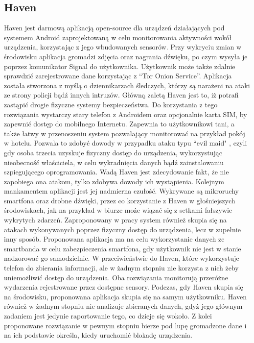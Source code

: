 \subsection{Haven}
Haven \cite{Haven} jest darmową aplikacją open-source dla urządzeń działających pod systemem Android zaprojektowaną w celu monitorowania aktywności wokół urządzenia,
korzystając z jego wbudowanych sensorów. Przy wykryciu zmian w środowisku aplikacja gromadzi zdjęcia oraz nagrania dźwięku, po czym wysyła je poprzez komunikator Signal do użytkownika. Użytkownik może także zdalnie sprawdzić zarejestrowane dane korzystając z ``Tor Onion Service''. Aplikacja została stworzona z myślą o dziennikarzach śledczych, którzy są narażeni na ataki ze strony policji bądź innych
intruzów.
\newline\newline
\indent Główną zaletą Haven jest to, iż potrafi zastąpić drogie fizyczne systemy bezpieczeństwa. Do korzystania z tego rozwiązania wystarczy stary telefon z Androidem oraz opcjonalnie karta SIM, by zapewnić dostęp do mobilnego Internetu. Zapewnia to użytkownikowi tani, a także łatwy w przenoszeniu system pozwalający monitorować na przykład pokój w hotelu. Pozwala to zdobyć dowody w przypadku ataku typu ``evil maid" \cite{Evil-Maid}, czyli gdy osoba trzecia uzyskuje fizyczny dostęp do urządzenia, wykorzystując nieobecność właściciela, w celu wykradnięcia danych bądź zainstalowaniu szpiegującego oprogramowania.
\newline\newline
\indent Wadą Haven jest zdecydowanie fakt, że nie zapobiega ona atakom, tylko zdobywa dowody ich wystąpienia. Kolejnym mankamentem aplikacji jest jej nadmierna czułość. Wykrywane są mikroruchy smartfona oraz drobne dźwięki, przez co korzystanie z Haven w głośniejszych środowiskach, jak na przykład w biurze może wiązać się z setkami fałszywie wykrytych zdarzeń.
\newline\newline
\indent Zaproponowany w pracy system również skupia się na atakach wykonywanych poprzez fizyczny dostęp do urządzenia, lecz w zupełnie inny sposób. Proponowana aplikacja ma na celu wykorzystanie danych ze smartbanda w celu zabezpieczenia smartfona, gdy użytkownik nie jest w stanie nadzorować go samodzielnie. W
przeciwieństwie do Haven, które wykorzystuje telefon do zbierania informacji, ale w żadnym stopniu nie korzysta z nich żeby uniemożliwić dostęp do
urządzenia. Oba rozwiązania monitorują przeróżne wydarzenia rejestrowane przez dostępne sensory. Podczas, gdy Haven skupia się na środowisku,
proponowana aplikacja skupia się na samym użytkowniku. Haven również w żadnym stopniu nie analizuje zbieranych danych, gdyż jego głównym zadaniem jest
jedynie raportowanie tego, co dzieje się wokoło. Z kolei proponowane rozwiązanie w pewnym stopniu bierze pod lupę gromadzone dane i na ich podstawie
określa, kiedy uruchomić blokadę urządzenia.
